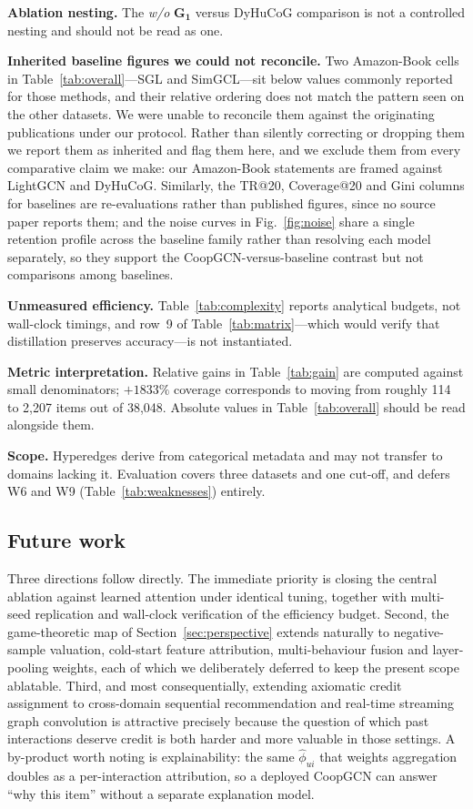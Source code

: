 \documentclass[final,5p,times,twocolumn]{elsarticle}
\begin{document}
\textbf{Ablation nesting.} The \emph{w/o} $\mathbf{G_1}$ versus DyHuCoG
comparison is not a controlled nesting and should not be read as one.

\textbf{Inherited baseline figures we could not reconcile.} Two
Amazon-Book cells in Table~\ref{tab:overall}---SGL and SimGCL---sit below
values commonly reported for those methods, and their relative ordering does
not match the pattern seen on the other datasets. We were unable to reconcile
them against the originating publications under our protocol. Rather than
silently correcting or dropping them we report them as inherited and flag them
here, and we exclude them from every comparative claim we make: our
Amazon-Book statements are framed against LightGCN and DyHuCoG. Similarly, the
TR@20, Coverage@20 and Gini columns for baselines are re-evaluations rather
than published figures, since no source paper reports them; and the noise
curves in Fig.~\ref{fig:noise} share a single retention profile across the
baseline family rather than resolving each model separately, so they support
the CoopGCN-versus-baseline contrast but not comparisons among baselines.

\textbf{Unmeasured efficiency.} Table~\ref{tab:complexity} reports analytical
budgets, not wall-clock timings, and row~9 of Table~\ref{tab:matrix}---which
would verify that distillation preserves accuracy---is not instantiated.

\textbf{Metric interpretation.} Relative gains in Table~\ref{tab:gain} are
computed against small denominators; $+1833\%$ coverage corresponds to moving
from roughly 114 to 2{,}207 items out of 38{,}048. Absolute values in
Table~\ref{tab:overall} should be read alongside them.

\textbf{Scope.} Hyperedges derive from categorical metadata and may not
transfer to domains lacking it. Evaluation covers three datasets and one
cut-off, and defers W6 and W9 (Table~\ref{tab:weaknesses}) entirely.

\subsection{Future work}
\label{sec:future}

Three directions follow directly. The immediate priority is closing the
central ablation against learned attention under identical tuning, together
with multi-seed replication and wall-clock verification of the efficiency
budget. Second, the game-theoretic map of Section~\ref{sec:perspective}
extends naturally to negative-sample valuation, cold-start feature
attribution, multi-behaviour fusion and layer-pooling weights, each of which we
deliberately deferred to keep the present scope ablatable. Third, and most
consequentially, extending axiomatic credit assignment to cross-domain
sequential recommendation and real-time streaming graph convolution is
attractive precisely because the question of which past interactions deserve
credit is both harder and more valuable in those settings. A by-product worth
noting is explainability: the same $\hat{\phi}_{ui}$ that weights aggregation
doubles as a per-interaction attribution, so a deployed CoopGCN can answer
``why this item'' without a separate explanation model.
\end{document}
